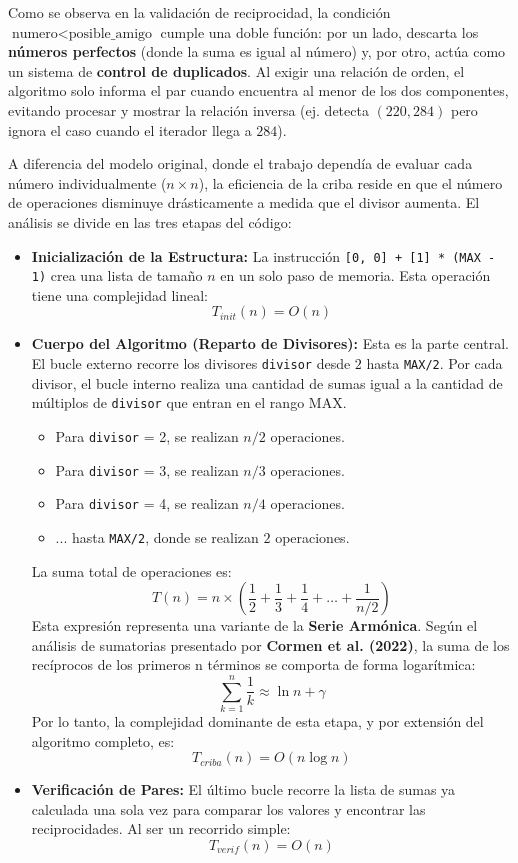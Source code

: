 Como se observa en la validación de reciprocidad, la condición $\text{numero} < \text{posible\_amigo}$ cumple una doble función: por un lado, descarta los \textbf{números perfectos} (donde la suma es igual al número) y, por otro, actúa como un sistema de \textbf{control de duplicados}. Al exigir una relación de orden, el algoritmo solo informa el par cuando encuentra al menor de los dos componentes, evitando procesar y mostrar la relación inversa (ej. detecta $(220, 284)$ pero ignora el caso cuando el iterador llega a $284$).

A diferencia del modelo original, donde el trabajo dependía de evaluar cada número individualmente ($n \times n$), la eficiencia de la criba reside en que el número de operaciones disminuye drásticamente a medida que el divisor aumenta. El análisis se divide en las tres etapas del código:

\begin{itemize}
	\item \textbf{Inicialización de la Estructura:}
	      La instrucción \colorbox{gray!10}{\texttt{[0, 0] + [1] * (MAX - 1)}} crea una lista de tamaño $n$ en un solo paso de memoria. Esta operación tiene una complejidad lineal:
	      \[ T_{init}(n) = O(n) \]

	\item \textbf{Cuerpo del Algoritmo (Reparto de Divisores):}
	      Esta es la parte central. El bucle externo recorre los divisores \texttt{divisor} desde $2$ hasta \texttt{MAX/2}. Por cada divisor, el bucle interno realiza una cantidad de sumas igual a la cantidad de múltiplos de \texttt{divisor} que entran en el rango MAX.
	      \begin{itemize}
		      \item Para \texttt{divisor} = 2, se realizan $n/2$ operaciones.
		      \item Para \texttt{divisor} = 3, se realizan $n/3$ operaciones.
		      \item Para \texttt{divisor} = 4, se realizan $n/4$ operaciones.
		      \item ... hasta \texttt{MAX/2}, donde se realizan $2$ operaciones.
	      \end{itemize}
	      La suma total de operaciones es:
	      \[
		      T(n) = n \times \left( \frac{1}{2} + \frac{1}{3} + \frac{1}{4} + \dots + \frac{1}{n/2} \right)
	      \]
	      Esta expresión representa una variante de la \textbf{Serie Armónica}. Según el análisis de sumatorias presentado por \textbf{Cormen et al. (2022)}, la suma de los recíprocos de los primeros n términos se comporta de forma logarítmica:
	      \[ \sum_{k=1}^{n} \frac{1}{k} \approx \ln n + \gamma \]
	      Por lo tanto, la complejidad dominante de esta etapa, y por extensión del algoritmo completo, es:
	      \[
		      T_{criba}(n) = O(n \log n)
	      \]

	\item \textbf{Verificación de Pares:}
	      El último bucle recorre la lista de sumas ya calculada una sola vez para comparar los valores y encontrar las reciprocidades. Al ser un recorrido simple:
	      \[ T_{verif}(n) = O(n) \]
\end{itemize}

